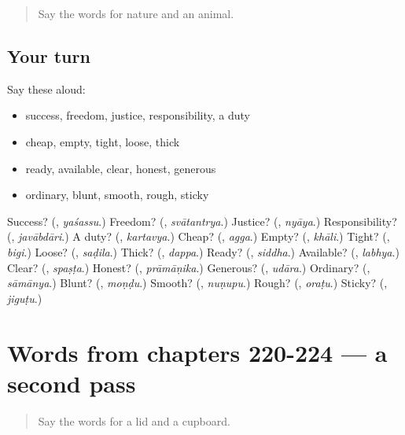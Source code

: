 \begin{quote}
Say the words for nature and an animal.
\end{quote}

\subsection*{Your turn}
Say these aloud:

\begin{itemize}
\raggedright
  \item success, freedom, justice, responsibility, a duty
  \item cheap, empty, tight, loose, thick
  \item ready, available, clear, honest, generous
  \item ordinary, blunt, smooth, rough, sticky
\end{itemize}

\begin{tcolorbox}[breakable,colback=teal!4,colframe=teal!35!black,title={Before you move on}]
Success? (\textbf{}, \emph{yaśassu}.) Freedom? (\textbf{}, \emph{svātantrya}.) Justice? (\textbf{}, \emph{nyāya}.) Responsibility? (\textbf{}, \emph{javābdāri}.) A duty? (\textbf{}, \emph{kartavya}.) Cheap? (\textbf{}, \emph{agga}.) Empty? (\textbf{}, \emph{khāli}.) Tight? (\textbf{}, \emph{bigi}.) Loose? (\textbf{}, \emph{saḍila}.) Thick? (\textbf{}, \emph{dappa}.) Ready? (\textbf{}, \emph{siddha}.) Available? (\textbf{}, \emph{labhya}.) Clear? (\textbf{}, \emph{spaṣṭa}.) Honest? (\textbf{}, \emph{prāmāṇika}.) Generous? (\textbf{}, \emph{udāra}.) Ordinary? (\textbf{}, \emph{sāmānya}.) Blunt? (\textbf{}, \emph{moṇḍu}.) Smooth? (\textbf{}, \emph{nuṇupu}.) Rough? (\textbf{}, \emph{oraṭu}.) Sticky? (\textbf{}, \emph{jiguṭu}.)
\end{tcolorbox}
\section[(dialogue)]{Words from chapters 220-224 — a second pass}

\label{lesson:KA-R224-second-pass-words-from-chapters-220-224}



\begin{quote}
Say the words for a lid and a cupboard.
\end{quote}

